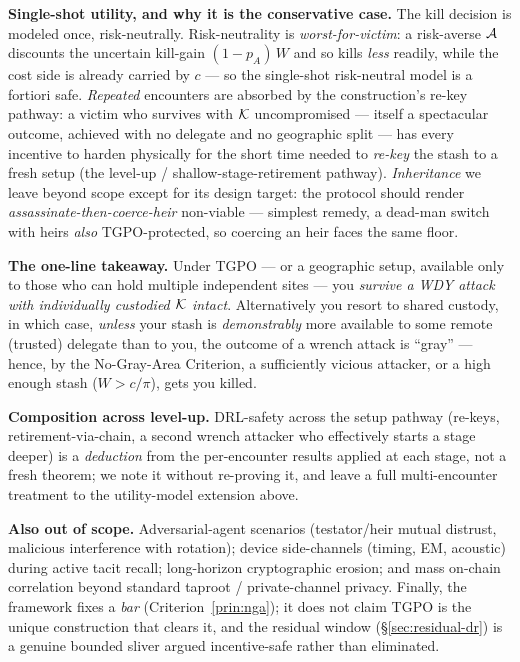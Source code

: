 \textbf{Single-shot utility, and why it is the conservative case.} The kill
decision is modeled once, risk-neutrally. Risk-neutrality is
\emph{worst-for-victim}: a risk-averse $\mathcal{A}$ discounts the uncertain kill-gain
$(1-p_A)\,W$ and so kills \emph{less} readily, while the cost side is already
carried by $c$ --- so the single-shot risk-neutral model is a fortiori safe.
\emph{Repeated} encounters are absorbed by the construction's re-key pathway: a
victim who survives with $\mathcal{K}$ uncompromised --- itself a spectacular outcome,
achieved with no delegate and no geographic split --- has every incentive to harden
physically for the short time needed to \emph{re-key} the stash to a fresh setup
(the level-up / shallow-stage-retirement pathway). \emph{Inheritance} we leave
beyond scope except for its design target: the protocol should render
\emph{assassinate-then-coerce-heir} non-viable --- simplest remedy, a dead-man
switch with heirs \emph{also} TGPO-protected, so coercing an heir faces the same
floor.

\textbf{The one-line takeaway.} Under TGPO --- or a geographic setup, available only
to those who can hold multiple independent sites --- you \emph{survive a WDY attack
with individually custodied $\mathcal{K}$ intact}. Alternatively you resort to shared custody,
in which case, \emph{unless} your stash is \emph{demonstrably} more available to some
remote (trusted) delegate than to you, the outcome of a wrench attack is ``gray'' ---
hence, by the No-Gray-Area Criterion, a sufficiently vicious attacker, or a high
enough stash ($W > c/\pi$), gets you killed.

\textbf{Composition across level-up.} DRL-safety across the setup pathway (re-keys,
retirement-via-chain, a second wrench attacker who effectively starts a stage
deeper) is a \emph{deduction} from the per-encounter results applied at each stage,
not a fresh theorem; we note it without re-proving it, and leave a full
multi-encounter treatment to the utility-model extension above.

\textbf{Also out of scope.} Adversarial-agent scenarios (testator/heir mutual
distrust, malicious interference with rotation); device side-channels (timing, EM,
acoustic) during active tacit recall; long-horizon cryptographic erosion; and mass
on-chain correlation beyond standard taproot / private-channel privacy. Finally, the
framework fixes a \emph{bar} (Criterion~\ref{prin:nga}); it does not claim TGPO is
the unique construction that clears it, and the residual window
(\S\ref{sec:residual-dr}) is a genuine bounded sliver argued incentive-safe rather than
eliminated.

